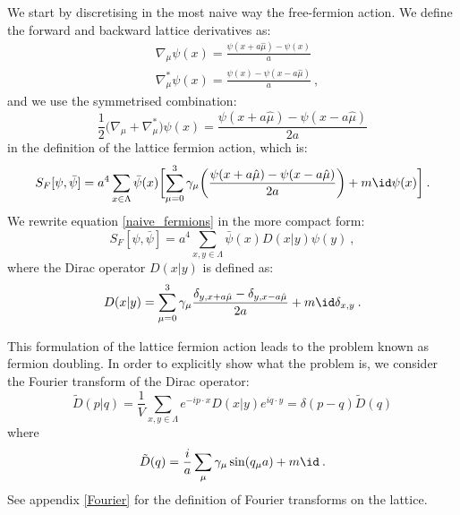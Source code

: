 We start by discretising in the most naive way the free-fermion action. We define the forward and backward lattice derivatives as:
\begin{equation}
\begin{split}
&\nabla_{\mu} \psi(x) = \frac{ \psi(x+a\hat\mu) - \psi(x) }{a} \\
&\nabla^*_{\mu} \psi(x) = \frac{ \psi(x) - \psi(x - a\hat\mu)  }{a}\: ,
\end{split}
\end{equation}
%
and we use the symmetrised combination:
\begin{equation}
\frac{1}{2} \bigl( \nabla_{\mu} + \nabla^*_{\mu} \bigr) \psi(x) = \frac{ \psi(x+a\hat\mu) - \psi(x -  a\hat\mu)}{2a}
\end{equation}
%
in the definition of the lattice fermion action, which is:
\begin{equation}
S_F [\psi,\bar\psi] = a^4 \sum_{x \in \Lambda} \bar \psi(x) \biggl[ \sum_{\mu = 0}^3 \gamma_{\mu} \biggl( \frac{\psi(x+a\hat\mu) - \psi(x - a\hat\mu)}{2a} \biggr) + m\id\psi(x) \biggr] \: .
\label{naive_fermions}
\end{equation}
%
We rewrite equation \ref{naive_fermions} in the more compact form:
\begin{equation}
S_F [\psi,\bar\psi] = a^4 \sum_{x,y \in \Lambda } \bar \psi(x) D(x \vert y) \psi(y) \: ,
\end{equation}
%
where the Dirac operator $D(x\vert y)$ is defined as:
\begin{equation}
D(x \vert y) = \sum_{\mu = 0}^3  \gamma_{\mu} \frac{\delta_{y,x+a\hat\mu} - \delta_{y,x-a\hat\mu}}{2a} + m \id \delta_{x,y} \: .
\end{equation}


This formulation  of the lattice fermion action leads to the problem known as fermion doubling. In order to explicitly show what the problem is, we consider the Fourier transform of the Dirac operator:
\begin{equation}
\tilde D(p \vert q) = \frac{1}{V} \sum_{x,y \in \Lambda} e^{-ip \cdot x} D( x \vert y) e^{i q \cdot y } = \delta(p-q) \tilde D(q)
\end{equation}
%
where
\begin{equation}
\tilde D(q) = \frac{i}{a} \sum_{\mu} \gamma_{\mu} \sin (q_{\mu} a) + m \id \: .
\label{naive_f_mom_space}
\end{equation}
%
 See appendix \ref{Fourier} for the definition of Fourier transforms on the lattice.

